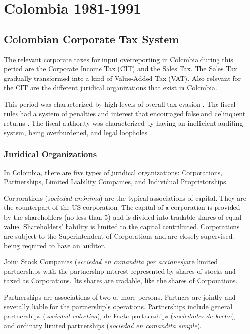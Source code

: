 \documentclass[
  12pt]{article}
\theoremstyle{definition}
\theoremstyle{remark}
\begin{document}
\section{Colombia 1981-1991}\label{colombia-1981-1991}

\subsection{Colombian Corporate Tax
System}\label{colombian-corporate-tax-system}

The relevant corporate taxes for input overreporting in Colombia during
this period are the Corporate Income Tax (CIT) and the Sales Tax. The
Sales Tax gradually transformed into a kind of Value-Added Tax (VAT).
Also relevant for the CIT are the different juridical organizations that
exist in Colombia.

This period was characterized by high levels of overall tax evasion
\citep{Sanchez1994}. The fiscal rules had a system of penalties and
interest that encouraged false and delinquent returns
\citep{McLure1989}. The fiscal authority was characterized by having an
inefficient auditing system, being overburdened, and legal loopholes
\citep{Perry1990}.

\subsubsection{Juridical Organizations}\label{juridical-organizations}

In Colombia, there are five types of juridical organizations:
Corporations, Partnerships, Limited Liability Companies, and Individual
Proprietorships.

Corporations (\emph{sociedad anónima}) are the typical associations of
capital. They are the counterpart of the US corporation. The capital of
a corporation is provided by the shareholders (no less than 5) and is
divided into tradable shares of equal value. Shareholders' liability is
limited to the capital contributed. Corporations are subject to the
Superintendent of Corporations and are closely supervised, being
required to have an auditor.

Joint Stock Companies (\emph{sociedad en comandita por acciones})are
limited partnerships with the partnership interest represented by shares
of stocks and taxed as Corporations. Its shares are tradable, like the
shares of Corporations.

Partnerships are associations of two or more persons. Partners are
jointly and severally liable for the partnership's operations.
Partnerships include general partnerships (\emph{sociedad colectiva}),
de Facto partnerships (\emph{sociedades de hecho}), and ordinary limited
partnerships (\emph{sociedad en comandita simple}).
\end{document}
